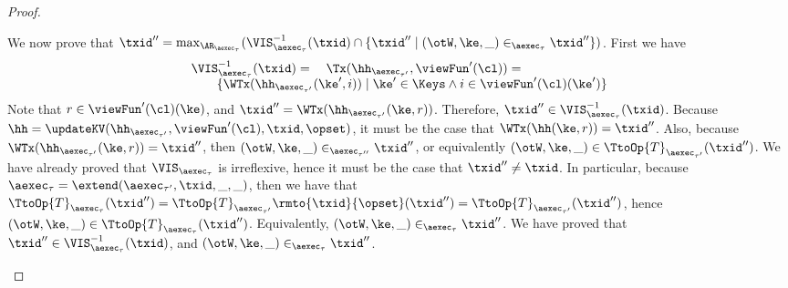 \begin{proof}
\begin{itemize}
\begin{itemize}
We now prove that 
$\txid'' = \max_{\AR_{\aexec_{\tau}}}(\VIS^{-1}_{\aexec_{\tau}}(\txid) \cap \{ \txid'' \mid (\otW, \ke, \_) \in_{\aexec_{\tau}} \txid''\})$. 
First we have
\[ 
\begin{array}{l}
\VIS^{-1}_{\aexec_{\tau}}(\txid) = 
\quad \Tx(\hh_{\aexec_{\tau'}}, \viewFun'(\cl)) = \\
\qquad \{\WTx(\hh_{\aexec_{\tau'}}(\ke',  i)) \mid \ke' \in \Keys \wedge  i \in \viewFun'(\cl)(\ke')\}
\end{array}
\]
Note that $r \in \viewFun'(\cl)(\ke)$, and $\txid'' = \WTx(\hh_{\aexec_{\tau'}}(\ke, r))$. 
Therefore, $\txid'' \in \VIS^{-1}_{\aexec_{\tau}}(\txid)$. 
Because $\hh = \updateKV(\hh_{\aexec_{\tau'}}, \viewFun'(\cl), \txid, \opset)$, it 
must be the case that $\WTx(\hh(\ke, r)) = \txid''$. Also, because $\WTx(\hh_{\aexec_{\tau'}}(\ke, r)) = \txid''$, 
then $(\otW, \ke, \_) \in_{\aexec_{\tau''}} \txid''$, or equivalently $(\otW, \ke, \_) \in \TtoOp{T}_{\aexec_{\tau'}}(\txid'')$. 
We have already proved that $\VIS_{\aexec_{\tau}}$ is irreflexive, hence it must be the case that $\txid'' \neq \txid$. 
In particular, because $\aexec_{\tau} = \extend(\aexec_{\tau'}, \txid, \_, \_)$, then we have that 
$\TtoOp{T}_{\aexec_{\tau}}(\txid'') = \TtoOp{T}_{\aexec_{\tau'}}\rmto{\txid}{\opset}(\txid'') = 
\TtoOp{T}_{\aexec_{\tau'}}(\txid'')$, hence $(\otW, \ke, \_) \in \TtoOp{T}_{\aexec_{\tau}}(\txid'')$. Equivalently, 
$(\otW, \ke, \_) \in_{\aexec_{\tau}} \txid''$. We have proved that $\txid'' \in \VIS^{-1}_{\aexec_{\tau}}(\txid)$, 
and $(\otW, \ke, \_) \in_{\aexec_{\tau}} \txid''$. 


\end{itemize}
\end{itemize}
\end{proof}
